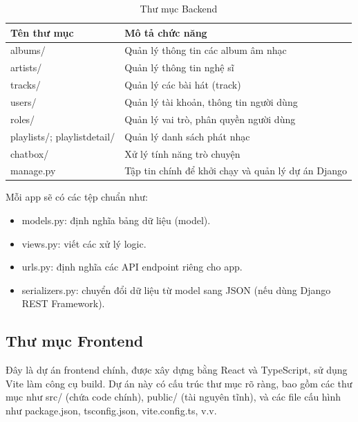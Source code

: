 \documentclass[a4paper]{article}
\begin{document}
    \vspace{0.5cm}
    \begin{table}[h]
        \centering
        \begin{tabular}{|l|l|} \hline 
             Tên thư mục& Mô tả chức năng\\ \hline 
             albums/
& Quản lý thông tin các album âm nhạc\\ \hline 
             artists/& Quản lý thông tin nghệ sĩ\\ \hline 
             tracks/& Quản lý các bài hát (track)\\ \hline 
             users/& Quản lý tài khoản, thông tin người dùng\\ \hline 
             roles/& Quản lý vai trò, phân quyền người dùng
\\ \hline 
             playlists/; playlistdetail/ & 
Quản lý danh sách phát nhạc\\ \hline 
 chatbox/&Xử lý tính năng trò chuyện\\\hline
             manage.py& Tập tin chính để khởi chạy và quản lý dự án Django\\ \hline
        \end{tabular}
\caption{Thư mục Backend}
        \label{tab:my_label}
    \end{table}

    Mỗi app sẽ có các tệp chuẩn như:
\begin{itemize}
    \item models.py: định nghĩa bảng dữ liệu (model).
    \item views.py: viết các xử lý logic.
    \item urls.py: định nghĩa các API endpoint riêng cho app.
    \item serializers.py: chuyển đổi dữ liệu từ model sang JSON (nếu dùng Django REST Framework).
\end{itemize}

\subsection{Thư mục Frontend}
Đây là dự án frontend chính, được xây dựng bằng React và TypeScript, sử dụng Vite làm công cụ build. Dự án này có cấu trúc thư mục rõ ràng, bao gồm các thư mục như src/ (chứa code chính), public/ (tài nguyên tĩnh), và các file cấu hình như package.json, tsconfig.json, vite.config.ts, v.v. 
\end{document}
